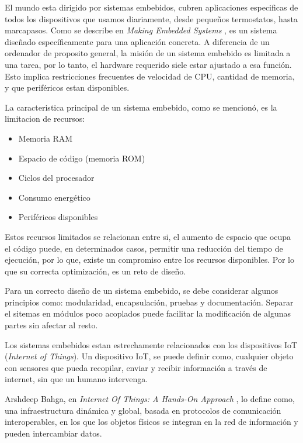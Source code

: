     El mundo esta dirigido por sistemas embebidos, cubren aplicaciones especificas de todos los dispositivos que usamos diariamente, 
    desde pequeños termostatos, hasta marcapasos. Como se describe en \textit{Making Embedded Systems} \cite{white_making_2012}, es un sistema 
    diseñado específicamente para una aplicación concreta. A diferencia de un ordenador de proposito general, la misión de un sistema embebido
    es limitada a una tarea, por lo tanto, el hardware requerido siele estar ajustado a esa función. Esto implica
    restricciones frecuentes de velocidad de CPU, cantidad de memoria, y que periféricos estan disponibles. 

    La caracteristica principal de un sistema embebido, como se mencionó, es la limitacion de recursos:
    \begin{itemize}
        \item Memoria RAM
        \item Espacio de código (memoria ROM)
        \item Ciclos del procesador
        \item Consumo energético
        \item Periféricos disponibles
    \end{itemize}

    Estos recursos limitados se relacionan entre si, el aumento de espacio que ocupa el código puede, en determinados casos, permitir una reducción
    del tiempo de ejecución, por lo que, existe un compromiso entre los recursos disponibles. Por lo que su correcta optimización, es un reto de diseño.

    Para un correcto diseño de un sistema embebido, se debe considerar algunos principios como: modularidad, encapsulación, pruebas y 
    documentación. Separar el sitemas en módulos poco acoplados puede facilitar la modificación de algunas partes
    sin afectar al resto. 

    Los sistemas embebidos estan estrechamente relacionados con los dispositivos IoT (\textit{Internet of Things}). Un dispositivo IoT, se puede definir como, 
    cualquier objeto con sensores que pueda recopilar, enviar y recibir información a través de internet, sin que un humano intervenga. 

    Arshdeep Bahga, en \textit{Internet Of Things: A Hands-On Approach} %
    , lo define como, una infraestructura dinámica y global, 
    basada en protocolos de comunicación interoperables, en los que los objetos físicos se integran en la red de información 
    y pueden intercambiar datos. 

